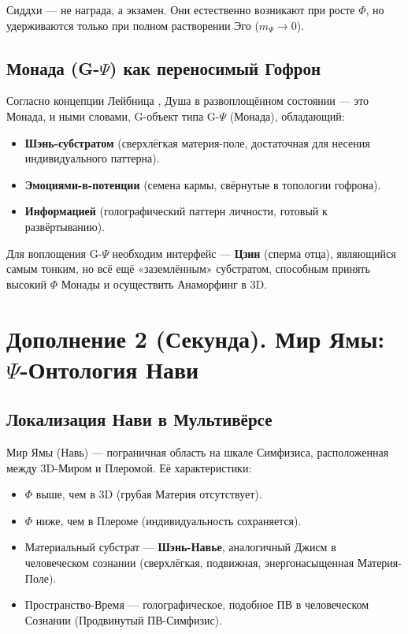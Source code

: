 \documentclass[a4paper,12pt]{article}
\begin{document}
Сиддхи — не награда, а экзамен. Они естественно возникают при росте $\Phi$, но удерживаются только при полном растворении Эго ($m_{\Psi} \to 0$).

\subsection{Монада (G-$\Psi$) как переносимый Гофрон}

Согласно концепции Лейбница \cite{leibniz1714}, Душа в развоплощённом состоянии — это Монада, и ными словами, G-объект типа G-$\Psi$ (Монада), обладающий:

\begin{itemize}
	\item \textbf{Шэнь-субстратом} (сверхлёгкая материя-поле, достаточная для несения индивидуального паттерна).
	\item \textbf{Эмоциями-в-потенции} (семена кармы, свёрнутые в топологии гофрона).
	\item \textbf{Информацией} (голографический паттерн личности, готовый к развёртыванию).
\end{itemize}

Для воплощения G-$\Psi$ необходим интерфейс — \textbf{Цзин} (сперма отца), являющийся самым тонким, но всё ещё «заземлённым» субстратом, способным принять высокий $\Phi$ Монады и осуществить Анаморфинг в 3D.

\newpage
\section{Дополнение 2 (Секунда). Мир Ямы: $\Psi$-Онтология Нави}

\subsection{Локализация Нави в Мультивёрсе}

Мир Ямы (Навь) — пограничная область на шкале Симфизиса, расположенная между 3D-Миром и Плеромой. Её характеристики:

\begin{itemize}
	\item $\Phi$ выше, чем в 3D (грубая Материя отсутствует).
	\item $\Phi$ ниже, чем в Плероме (индивидуальность сохраняется).
	\item Материальный субстрат — \textbf{Шэнь-Навье}, аналогичный Джисм в человеческом сознании (сверхлёгкая, подвижная, энергонасыщенная Материя-Поле).
	\item Пространство-Время — голографическое, подобное ПВ в человеческом Сознании (Продвинутый ПВ-Симфизис).
\end{itemize}
\end{document}
